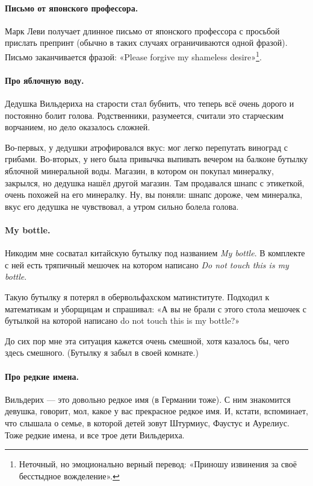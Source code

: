 \documentclass{book}
\begin{document}
\paragraph{Письмо от японского профессора.}
Марк Леви получает длинное письмо от японского профессора с просьбой прислать препринт (обычно в таких случаях ограничиваются одной фразой).
Письмо заканчивается фразой: «Please forgive my shameless desire»\footnote{Неточный, но эмоционально верный перевод: «Приношу извинения за своё бесстыдное вожделение».}.

\paragraph{Про яблочную воду.}
Дедушка Вильдериха на старости стал бубнить, что теперь всё очень дорого и постоянно болит голова.
Родственники, разумеется, считали это старческим ворчанием, но дело оказалось сложней.

Во-первых, у дедушки атрофировался вкус: мог легко перепутать виноград с грибами.
Во-вторых, у него была привычка выпивать вечером на балконе бутылку яблочной минеральной воды.
Магазин, в котором он покупал минералку, закрылся, но дедушка нашёл другой магазин.
Там продавался шнапс с этикеткой, очень похожей на его минералку.
Ну, вы поняли: шнапс дороже, чем минералка, вкус его дедушка не чувствовал, а утром сильно болела голова.

\paragraph{My bottle.}
Никодим мне сосватал китайскую бутылку под названием \textit{My bottle}.
В комплекте с ней есть тряпичный мешочек на котором написано \textit{Do not touch this is my bottle}.

Такую бутылку я потерял в обервольфахском матинституте.
Подходил к математикам и уборщицам и спрашивал: «А вы не брали с этого стола мешочек с бутылкой на которой написано do not touch this is my bottle?»

До сих пор мне эта ситуация кажется очень смешной, хотя казалось бы, чего здесь смешного.
(Бутылку я забыл в своей комнате.)

\paragraph{Про редкие имена.}
Вильдерих --- это довольно редкое имя (в Германии тоже).
С ним знакомится девушка, говорит, мол, какое у вас прекрасное редкое имя.
И, кстати, вспоминает, что слышала о семье, в которой детей зовут Штурмиус, Фаустус и Аурелиус.
Тоже редкие имена, и все трое дети Вильдериха.
\end{document}
